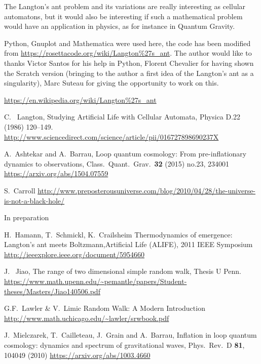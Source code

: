 \documentclass[twocolumn]{revtex4}
\begin{document}
The Langton's ant problem and its variations are really interesting as cellular automatons, but it would also be interesting if such a mathematical problem would have an application in physics, as for instance in Quantum Gravity. 
 







\begin{acknowledgments}
Python, Gnuplot and Mathematica were used here, the code has been modified from \url{https://rosettacode.org/wiki/Langton\%27s_ant}. The author would like to thanks Victor Santos for his help in Python, Florent Chevalier for having shown the Scratch version (bringing to the author a first idea of the Langton's ant as a singularity), Marc Suteau for giving the opportunity to work on this. 
\end{acknowledgments}






\begin{thebibliography}{99}



\url{https://en.wikipedia.org/wiki/Langton\%27s_ant}

C. ~Langton, Studying Artificial Life with Cellular Automata, Physica D.22 (1986) 120–149. 
\url{http://www.sciencedirect.com/science/article/pii/016727898690237X}

  A.~Ashtekar and A.~Barrau,
  Loop quantum cosmology: From pre-inflationary dynamics to observations,
  Class.\ Quant.\ Grav.\  {\bf 32} (2015) no.23,  234001
  \url{https://arxiv.org/abs/1504.07559}

 
S.~Carroll
\url{http://www.preposterousuniverse.com/blog/2010/04/28/the-universe-is-not-a-black-hole/}


In preparation


H.~Hamann, T.~Schmickl, K.~Crailsheim
Thermodynamics of emergence: Langton's ant meets Boltzmann,Artificial Life (ALIFE), 2011 IEEE Symposium
\url{http://ieeexplore.ieee.org/document/5954660}



J. ~Jiao, 
The range of two dimensional simple random walk, Thesis U Penn.
\url{https://www.math.upenn.edu/~pemantle/papers/Student-theses/Masters/Jiao140506.pdf}

G.F.~Lawler \& V.~Limic
Random Walk: A Modern Introduction
\url{http://www.math.uchicago.edu/~lawler/srwbook.pdf}


  J.~Mielczarek, T.~Cailleteau, J.~Grain and A.~Barrau,
 Inflation in loop quantum cosmology: dynamics and spectrum of gravitational waves,
  Phys.\ Rev.\ D {\bf 81}, 104049 (2010)
\url{https://arxiv.org/abs/1003.4660}



\end{thebibliography}
\end{document}
